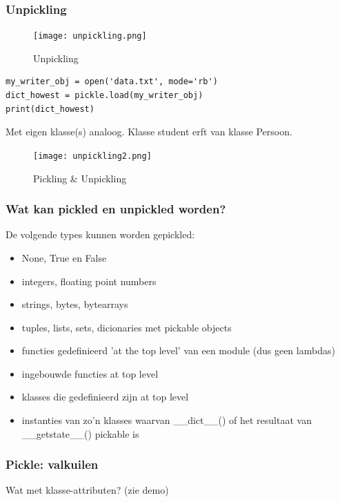 \documentclass{article}
\begin{document}
\subsubsection{Unpickling}

\begin{figure}[H]
    \centering
    \texttt{[image: unpickling.png]}
    \caption{Unpickling}
\end{figure}

\begin{verbatim}
my_writer_obj = open('data.txt', mode='rb')
dict_howest = pickle.load(my_writer_obj)
print(dict_howest)
\end{verbatim}

Met eigen klasse(s) analoog. Klasse student erft van klasse Persoon.

\begin{figure}[H]
    \centering
    \texttt{[image: unpickling2.png]}
    \caption{Pickling \& Unpickling}
\end{figure}

\subsubsection{Wat kan pickled en unpickled worden?}

De volgende types kunnen worden gepickled:

\begin{itemize}
    \item None, True en False
    \item integers, floating point numbers
    \item strings, bytes, bytearrays
    \item tuples, lists, sets, dicionaries met pickable objects
    \item functies gedefinieerd 'at the top level' van een module (dus geen lambdas)
    \item ingebouwde functies at top level
    \item klasses die gedefinieerd zijn at top level
    \item instanties van zo'n klasses waarvan \_\_dict\_\_() of het resultaat van \_\_getstate\_\_() pickable is
\end{itemize}

\subsubsection{Pickle: valkuilen}

Wat met klasse-attributen? (zie demo)
\end{document}
